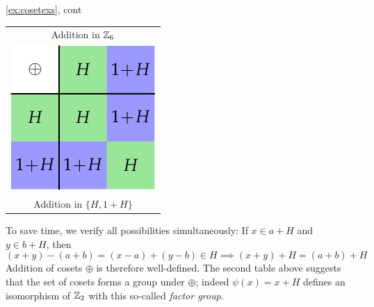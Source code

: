 \begin{examples*}{\ref{ex:cosetexs}, cont}{}
\begin{enumerate}
\begin{minipage}[t]{0.25\linewidth}
\begin{tabular}{@{}c@{}}
				Addition in $\mathbb{Z}_6$\\[5pt]
				\includegraphics[scale=0.9]{factor-z6-2}\\
				Addition in $\{H,1+H\}$
			\end{tabular}
		\end{minipage}\medbreak
		To save time, we verify all possibilities simultaneously: If $x\in a+H$ and $y\in b+H$, then
		\[
			(x+y)-(a+b)=(x-a)+(y-b)\in H\implies (x+y)+H=(a+b)+H
		\]
		Addition of cosets $\oplus$ is therefore well-defined. The second table above suggests that the set of cosets forms a group under $\oplus$; indeed $\psi(x)=x+H$ defines an isomorphism of $\mathbb{Z}_2$ with this so-called \emph{factor group.}
	

\end{enumerate}
\end{examples*}
